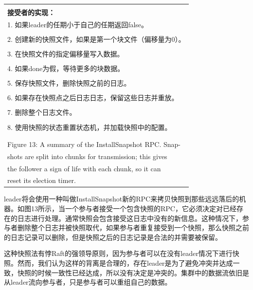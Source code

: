 \documentclass[journal]{IEEEtran}
\begin{document}
\begin{table}[htp]
\begin{center}
\begin{tabular}{|p{2.5cm}p{5.5cm}|}
&\\
\multicolumn{2}{|l|}{\textbf{接受者的实现：}} \\
\multicolumn{2}{|l|}{1. 如果leader的任期小于自己的任期返回false。} \\
&\\
\multicolumn{2}{|l|}{2. 创建新的快照文件，如果是第一个块文件（偏移量为0）。} \\
&\\
\multicolumn{2}{|l|}{3. 在快照文件的指定偏移量写入数据。}\\
&\\
\multicolumn{2}{|l|}{4. 如果done为假，等待更多的块数据。}\\
&\\
\multicolumn{2}{|l|}{5. 保存快照文件，删除快照之前的日志。}\\
&\\
\multicolumn{2}{|l|}{6. 如果存在快照点之后日志日志，保留这些日志并重放。}\\
&\\
\multicolumn{2}{|l|}{7. 删除整个日志文件。}\\
&\\
\multicolumn{2}{|l|}{8. 使用快照的状态重置状态机，并加载快照中的配置。}\\
&\\
\hline
\multicolumn{2}{l}{}\\
\multicolumn{2}{l}{Figure 13: A summary of the InstallSnapshot RPC. Snap-}\\
\multicolumn{2}{l}{\qquad \qquad shots are split into chunks for transmission; this gives}\\
\multicolumn{2}{l}{\qquad \qquad the follower a sign of life with each chunk, so it can} \\
\multicolumn{2}{l}{\qquad \qquad  reset its election timer.}\\
\end{tabular}
\end{center}
\label{default}
\end{table}%

leader将会使用一种叫做InstallSnapshot新的RPC来拷贝快照到那些远远落后的机器。如图13所示，当一个参与者接受一个包含快照的RPC，它必须决定对已经存在的日志进行处理。通常快照会包含接受这日志中没有的新信息。这种情况下，参与者删除整个日志并被快照取代，如果参与者重复接受到一个快照，那么快照之前的日志记录可以删除，但是快照之后的日志记录是合法的并需要被保留。

这种快照法有悖Raft的强领导原则，因为参与者可以在没有leader情况下进行快照。然而，我们认为这样的背离是合理的，存在leader是为了避免冲突并达成一致，快照的时候一致性已经达成，所以没有决定是冲突的。集群中的数据流依旧是从leader流向参与者，只是参与者可以重组自己的数据。
\end{document}

